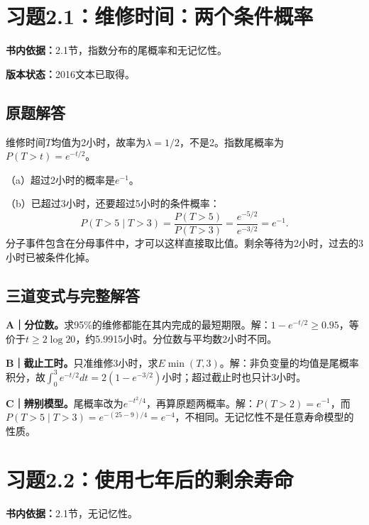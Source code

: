 \documentclass[
  11pt,
  a4paper,
  UTF8,fontset=fandol]{ctexart}
\let\OldSection\section
\renewcommand{\section}{\Needspace{7\baselineskip}\OldSection}
\let\OldSubsection\subsection
\renewcommand{\subsection}{\Needspace{5\baselineskip}\OldSubsection}
\begin{document}
\newpage

\section{习题2.1：维修时间：两个条件概率}\label{ux4e60ux98982.1ux7ef4ux4feeux65f6ux95f4ux4e24ux4e2aux6761ux4ef6ux6982ux7387}

\textbf{书内依据：}2.1节，指数分布的尾概率和无记忆性。

\textbf{版本状态：}2016文本已取得。

\subsection{原题解答}\label{ux539fux9898ux89e3ux7b54}

维修时间\(T\)均值为2小时，故率为\(\lambda=1/2\)，不是2。指数尾概率为\(P(T>t)=e^{-t/2}\)。

（a）超过2小时的概率是\(\boxed{e^{-1}}\)。

（b）已超过3小时，还要超过5小时的条件概率：
\[P(T>5\mid T>3)=\frac{P(T>5)}{P(T>3)}=\frac{e^{-5/2}}{e^{-3/2}}=\boxed{e^{-1}}.\]
分子事件包含在分母事件中，才可以这样直接取比值。剩余等待为2小时，过去的3小时已被条件化掉。

\subsection{三道变式与完整解答}\label{ux4e09ux9053ux53d8ux5f0fux4e0eux5b8cux6574ux89e3ux7b54}

\textbf{A｜分位数。}求95\%的维修都能在其内完成的最短期限。解：\(1-e^{-t/2}\ge0.95\)，等价于\(t\ge2\log20\)，约5.9915小时。分位数与平均数2小时不同。

\textbf{B｜截止工时。}只准维修3小时，求\(E\min(T,3)\)。解：非负变量的均值是尾概率积分，故\(\int_0^3e^{-t/2}dt=2(1-e^{-3/2})\)小时；超过截止时也只计3小时。

\textbf{C｜辨别模型。}尾概率改为\(e^{-t^2/4}\)，再算原题两概率。解：\(P(T>2)=e^{-1}\)，而\(P(T>5\mid T>3)=e^{-(25-9)/4}=e^{-4}\)，不相同。无记忆性不是任意寿命模型的性质。

\newpage

\section{习题2.2：使用七年后的剩余寿命}\label{ux4e60ux98982.2ux4f7fux7528ux4e03ux5e74ux540eux7684ux5269ux4f59ux5bffux547d}

\textbf{书内依据：}2.1节，无记忆性。
\end{document}
